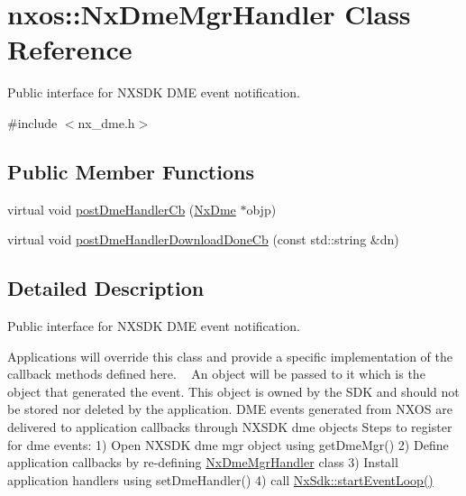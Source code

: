 \hypertarget{classnxos_1_1_nx_dme_mgr_handler}{}\section{nxos\+:\+:Nx\+Dme\+Mgr\+Handler Class Reference}
\label{classnxos_1_1_nx_dme_mgr_handler}


Public interface for N\+X\+S\+DK D\+ME event notification.  




{\ttfamily \#include $<$nx\+\_\+dme.\+h$>$}

\subsection*{Public Member Functions}
\begin{DoxyCompactItemize}
\item 
virtual void \mbox{\hyperlink{classnxos_1_1_nx_dme_mgr_handler_a26838519d4f1d17c2036feb036a0e892}{post\+Dme\+Handler\+Cb}} (\mbox{\hyperlink{classnxos_1_1_nx_dme}{Nx\+Dme}} $\ast$objp)
\item 
virtual void \mbox{\hyperlink{classnxos_1_1_nx_dme_mgr_handler_a785b584b966bb8212c22e506ff568236}{post\+Dme\+Handler\+Download\+Done\+Cb}} (const std\+::string \&dn)
\end{DoxyCompactItemize}


\subsection{Detailed Description}
Public interface for N\+X\+S\+DK D\+ME event notification. 

Applications will override this class and provide a specific implementation of the callback methods defined here. ~\newline
 An object will be passed to it which is the object that generated the event. This object is owned by the S\+DK and should not be stored nor deleted by the application. D\+ME events generated from N\+X\+OS are delivered to application callbacks through N\+X\+S\+DK dme objects Steps to register for dme events\+: 1) Open N\+X\+S\+DK dme mgr object using get\+Dme\+Mgr() 2) Define application callbacks by re-\/defining \mbox{\hyperlink{classnxos_1_1_nx_dme_mgr_handler}{Nx\+Dme\+Mgr\+Handler}} class 3) Install application handlers using set\+Dme\+Handler() 4) call \mbox{\hyperlink{classnxos_1_1_nx_sdk_a75ca70643fe325ddf0eea62c1f8c4cc8}{Nx\+Sdk\+::start\+Event\+Loop()}} 

